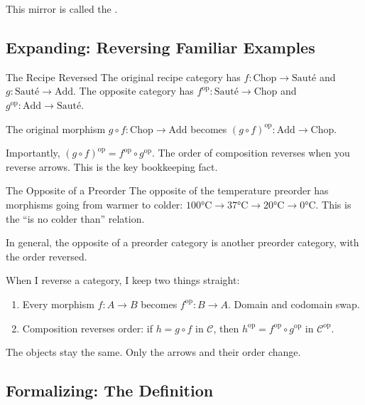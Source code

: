 This mirror is called the .

\subsection{Expanding: Reversing Familiar Examples}

\begin{example}{The Recipe Reversed}
The original recipe category has $f : \mathrm{Chop} \to \mathrm{Sauté}$ and
$g : \mathrm{Sauté} \to \mathrm{Add}$. The opposite category has
$f^{\mathrm{op}} : \mathrm{Sauté} \to \mathrm{Chop}$ and
$g^{\mathrm{op}} : \mathrm{Add} \to \mathrm{Sauté}$.

The original morphism $g \circ f : \mathrm{Chop} \to \mathrm{Add}$ becomes
$(g \circ f)^{\mathrm{op}} : \mathrm{Add} \to \mathrm{Chop}$.

Importantly, $(g \circ f)^{\mathrm{op}} = f^{\mathrm{op}} \circ g^{\mathrm{op}}$.
The order of composition reverses when you reverse arrows. This is the key
bookkeeping fact.
\end{example}

\begin{example}{The Opposite of a Preorder}
The opposite of the temperature preorder has morphisms going from warmer to
colder: $100°\text{C} \to 37°\text{C} \to 20°\text{C} \to 0°\text{C}$.
This is the ``is no colder than'' relation.

In general, the opposite of a preorder category is another preorder category,
with the order reversed.
\end{example}

\begin{dialog}
When I reverse a category, I keep two things straight:
\begin{enumerate}
  \item Every morphism $f : A \to B$ becomes $f^{\mathrm{op}} : B \to A$.
        Domain and codomain swap.
  \item Composition reverses order: if $h = g \circ f$ in $\mathcal{C}$,
        then $h^{\mathrm{op}} = f^{\mathrm{op}} \circ g^{\mathrm{op}}$ in
        $\mathcal{C}^{\mathrm{op}}$.
\end{enumerate}
The objects stay the same. Only the arrows and their order change.
\end{dialog}

\subsection{Formalizing: The Definition}

